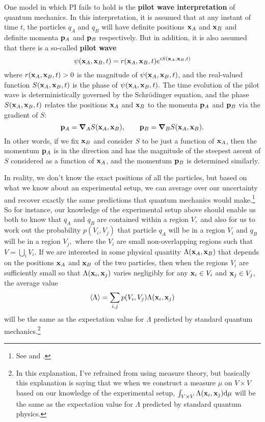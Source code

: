 One model in which PI fails to hold is the \textbf{pilot wave interpretation} of quantum mechanics. In this interpretation, it is assumed that at any instant of time $t$, the particles $q_A$ and $q_B$ will have definite positions $\vb{x}_A$ and $\vb{x}_B$ and definite momenta $\vb{p}_A$ and $\vb{p}_B$ respectively. But in addition, it is also assumed that there is a so-called \textbf{pilot wave} 
\begin{equation}
\psi(\vb{x}_A, \vb{x}_B, t)=r(\vb{x}_A, \vb{x}_B, t)e^{i S(\vb{x}_A, \vb{x}_B, t)} 
\end{equation}
where $r(\vb{x}_A, \vb{x}_B, t)>0$ is the magnitude of $\psi(\vb{x}_A, \vb{x}_B, t)$, and the real-valued function $S(\vb{x}_A, \vb{x}_B,t )$ is the phase of $\psi(\vb{x}_A, \vb{x}_B, t).$
The time evolution of the pilot wave is deterministically governed by the Schr\"{o}dinger equation, and the phase $S(\vb{x}_A, \vb{x}_B, t )$ relates the positions $\vb{x}_A$ and $\vb{x}_B$ to the momenta $\vb{p}_A$ and $\vb{p}_B$ via the gradient of $S$:
\begin{equation}
\vb{p}_A=\grad_A{S}(\vb{x}_A, \vb{x}_B),\qquad
\vb{p}_B=\grad_B{S}(\vb{x}_A, \vb{x}_B).
\end{equation}
In other words, if we fix $\vb{x}_B$ and consider $S$ to be just a function of $\vb{x}_A$, then the momentum $\vb{p}_A$ is in the direction and has the magnitude of the steepest ascent of $S$ considered as a function of $\vb{x}_A$, and the momentum $\vb{p}_B$ is determined similarly. 

In reality, we don't know the exact positions of all the particles, but based on what we know about an experimental setup, we can average over our uncertainty and recover exactly the same predictions that quantum mechanics would make.\footnote{See \cite{BohmDavid1952A} and \cite{BohmDavid1952B}.} So for instance, our knowledge of the experimental setup above should enable us both to know that $q_A$ and $q_B$ are contained within a region $V,$ and also for us to work out the probability  $p(V_i, V_j)$ that particle $q_A$  will be in a region $V_i$ and $q_B$ will be in a region $V_j,$ where the $V_i$ are small non-overlapping regions such that $V=\bigcup_iV_i$. If we are interested in some physical quantity $\Lambda(\vb{x}_A, \vb{x}_B)$ that depends on the positions $\vb{x}_A$ and $\vb{x}_B$ of the two particles, then when the regions $V_i$ are  sufficiently small so that $\Lambda(\vb{x}_i, \vb{x}_j)$ varies negligibly for any $\vb{x}_i\in V_i$ and $\vb{x}_j\in V_j$,  the average value
\begin{equation}\label{bohmconsistency}
\ev{\Lambda}=\sum_{i,j}p(V_i, V_j)\Lambda(\vb{x}_i, \vb{x}_j)
\end{equation}
will be the same as the expectation value for $\Lambda$ predicted by standard quantum mechanics.\footnote{In this explanation, I've refrained from using measure theory, but basically this explanation is saying that we when we construct a measure $\mu$ on $V\times V$ based on our knowledge of the experimental setup,  $\int_{V\times V}\Lambda(\vb{x}_i, \vb{x}_j)\dd\mu$ will be the same as the expectation value for $\Lambda$ predicted by standard quantum physics. }

